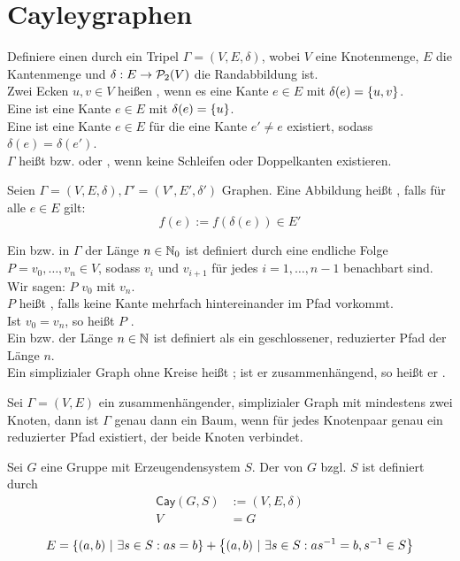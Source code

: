 \documentclass{article}
\newcommand{\Cay}[2]{\textsf{Cay}(#1,#2)}
\begin{document}
\section{Cayleygraphen}
Definiere einen  durch ein Tripel $\Gamma = (V,E,\delta)$, wobei $V$ eine Knotenmenge, $E$ die Kantenmenge und $\delta : E \rightarrow \P_2(V)$ die Randabbildung ist.\\
Zwei Ecken $u,v \in V$ heißen , wenn es eine Kante $e \in E$ mit $\delta(e) = \set{u,v}{}$.\\
Eine  ist eine Kante $e \in E$ mit $\delta(e) = \set{u}{}$.\\
Eine ist eine Kante $e \in E$ für die eine Kante $e' \neq e$ existiert, sodass $\delta(e) = \delta(e')$.\\
$\Gamma$ heißt  bzw.  oder , wenn keine Schleifen oder Doppelkanten existieren.


Seien $\Gamma = (V,E, \delta), \Gamma' = (V', E', \delta')$ Graphen. Eine Abbildung
heißt , falls für alle $e \in E$ gilt:
\[ f(e) := f(\delta(e)) \in E' \]

Ein  bzw.  in $\Gamma$ der Länge $n \in \N_0$ ist definiert durch eine endliche Folge $P = v_0,\ldots, v_n \in V$, sodass $v_i$ und $v_{i+1}$ für jedes $i = 1,\ldots, n-1$ benachbart sind.\\
Wir sagen: $P$  $v_0$ mit $v_n$.\\
$P$ heißt , falls keine Kante mehrfach hintereinander im Pfad vorkommt.\\
Ist $v_0 = v_n$, so heißt $P$ .\\
Ein  bzw.  der Länge $n \in \N$ ist definiert als ein geschlossener, reduzierter Pfad der Länge $n$.\\
Ein simplizialer Graph ohne Kreise heißt ; ist er zusammenhängend, so heißt er .

Sei $\Gamma = (V,E)$ ein zusammenhängender, simplizialer Graph mit mindestens zwei Knoten, dann ist $\Gamma$ genau dann ein Baum, wenn für jedes Knotenpaar genau ein reduzierter Pfad existiert, der beide Knoten verbindet.

Sei $G$ eine Gruppe mit Erzeugendensystem $S$. Der  von $G$ bzgl. $S$ ist definiert durch
\begin{align*}
\Cay{G}{S} & := (V,E,\delta)\\
V &= G\\
\end{align*}
\[E  = \set{(a,b)}{\exists s \in S: as = b} + \set{(a,b)}{\exists s \in S: as\i = b, s\i \in S}\]
\end{document}

